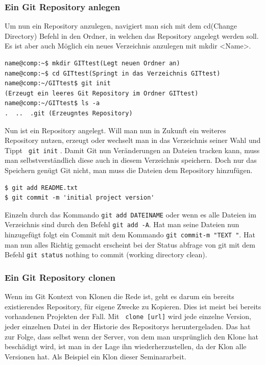 \documentclass[12pt,a4paper,bibliography=totocnumbered,listof=totocnumbered]{scrartcl}
\begin{document}
\subsubsection{Ein Git Repository anlegen}
Um nun ein Repository anzulegen, navigiert man sich mit dem cd(Change Directory) Befehl in den Ordner, in welchen das Repository angelegt werden soll. Es ist aber auch Möglich ein neues Verzeichnis anzulegen mit mkdir <Name>. 

\vspace{1em}
\begin{lstlisting}[caption=Git Repository anlegen, label=lst:arduino]
name@comp:~$ mkdir GITtest(Legt neuen Ordner an)
name@comp:~$ cd GITtest(Springt in das Verzeichnis GITtest)
name@comp:~/GITtest$ git init 
(Erzeugt ein leeres Git Repository im Ordner GITtest)
name@comp:~/GITtest$ ls -a
.  ..  .git (Erzeugntes Repository)

\end{lstlisting}

Nun ist ein Repository angelegt.
Will man nun in Zukunft ein weiteres Repository nutzen, erzeugt oder wechselt man in das Verzeichnis seiner Wahl und Tippt  \lstinline| git init| . Damit Git nun Veränderungen an Dateien tracken kann, muss man selbstverständlich diese auch in diesem Verzeichnis speichern. Doch nur das Speichern genügt Git nicht, man muss die Dateien dem Repository hinzufügen. 

 \vspace{1em}
\begin{lstlisting}[caption=Git Repository Dateien hinzufügen, label=lst:arduino]
$ git add README.txt
$ git commit -m 'initial project version'

\end{lstlisting}


Einzeln durch das Kommando \lstinline|git add DATEINAME| oder wenn es alle Dateien im Verzeichnis sind durch den Befehl \lstinline|git add -A|. Hat man seine Dateien nun hinzugefügt folgt ein Commit mit dem Kommando \lstinline|git commit-m "TEXT "|. Hat man nun alles Richtig gemacht erscheint bei der Status abfrage von git mit dem Befehl \lstinline|git status| nothing to commit (working directory clean).


\subsubsection{Ein Git Repository clonen}
Wenn im Git Kontext von Klonen die Rede ist, geht es darum ein bereits existierendes Repository, für eigene Zwecke zu Kopieren. Dies ist meist bei bereits vorhandenen Projekten der Fall. Mit \lstinline| clone [url]| wird jede einzelne Version, jeder einzelnen Datei in der Historie des Repositorys heruntergeladen. Das hat zur Folge, dass selbst wenn der Server, von dem man ursprünglich den Klone hat beschädigt wird, ist man in der Lage ihn wiederherzustellen, da der Klon alle Versionen hat. Als Beispiel ein Klon dieser Seminararbeit.
\end{document}
